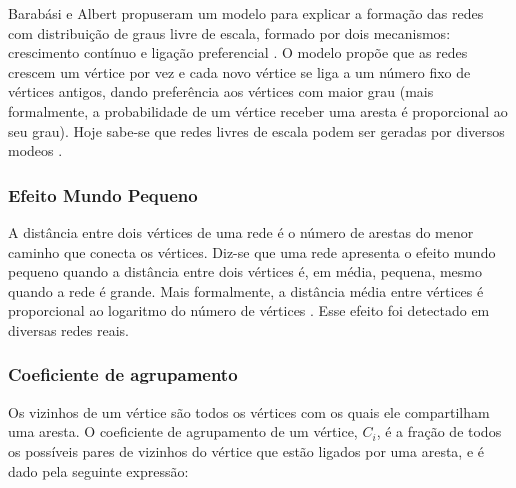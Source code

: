 \documentclass{article}
\begin{document}
Barabási e Albert propuseram um modelo para explicar a formação das redes com distribuição de graus livre de escala, formado por dois mecanismos: crescimento contínuo e ligação preferencial \cite{Albert2002}. O modelo propõe que as redes crescem um vértice por vez e cada novo vértice se liga a um número fixo de vértices antigos, dando preferência aos vértices com maior grau (mais formalmente, a probabilidade de um vértice receber uma aresta é proporcional ao seu grau). Hoje sabe-se que redes livres de escala podem ser geradas por diversos modeos \cite{Albert2000,Kumar2000,Aiello2000b,Dorogovtsev2002,Bollobas2003,Deo2005}.


\subsubsection{Efeito Mundo Pequeno}

A distância entre dois vértices de uma rede é o número de arestas do menor caminho que conecta os vértices. Diz-se que uma rede apresenta o efeito mundo pequeno quando a distância entre dois vértices é, em média, pequena, mesmo quando a rede é grande. Mais formalmente, a distância média entre vértices é proporcional ao logaritmo do número de vértices \cite{Watts1998}. Esse efeito foi detectado em diversas redes reais.



\subsubsection{Coeficiente de agrupamento}

Os vizinhos de um vértice são todos os vértices com os quais ele compartilham uma aresta. O coeficiente de agrupamento de um vértice, $C_i$, é a fração de todos os possíveis pares de vizinhos do vértice que estão ligados por uma aresta, e é dado pela seguinte expressão:
\end{document}
